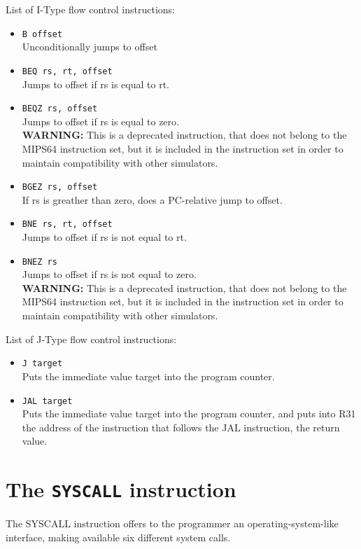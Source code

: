 \documentclass[12pt]{report}
\newcommand{\MS}{MIPS64}
\newcommand{\WARN}{\textbf{WARNING:} This is a deprecated instruction, that
does not belong to the \MS{} instruction set, but it is included in the instruction
set in order to maintain compatibility with other simulators.}
\begin{document}
List of I-Type flow control instructions:

\begin{itemize}
	\item \texttt{B offset}\\
	Unconditionally jumps to offset

	\item \texttt{BEQ rs, rt, offset}\\
	Jumps to offset if rs is equal to rt.

	\item \texttt{BEQZ rs, offset}\\
	Jumps to offset if rs is equal to zero.\\
	\WARN

	\item \texttt{BGEZ rs, offset}\\
	If rs is greather than zero, does a PC-relative jump to offset.

	\item \texttt{BNE rs, rt, offset}\\
	Jumps to offset if rs is not equal to rt.

	\item \texttt{BNEZ rs}\\
	Jumps to offset if rs is not equal to zero.\\
	\WARN
\end{itemize}

List of J-Type flow control instructions:

\begin{itemize}
	\item \texttt{J target}\\
	Puts the immediate value target into the program counter.

	\item \texttt{JAL target}\\
	Puts the immediate value target into the program counter, and puts into R31 the
	address of the instruction that follows the JAL instruction, the return
	value.
\end{itemize}

\section{The \texttt{SYSCALL} instruction}
\label{sysc-man}
The SYSCALL instruction offers to the programmer an operating-system-like
interface, making available six different system calls.
\end{document}
